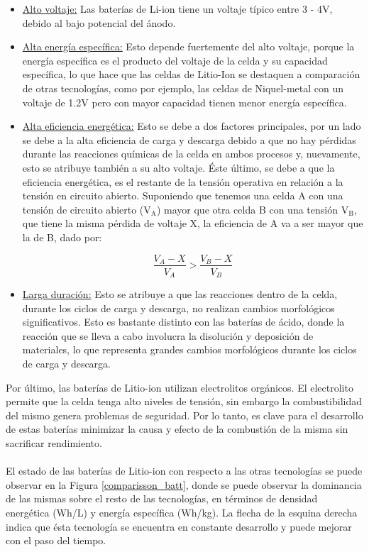 \documentclass[10pt,a4paper]{article}
\begin{document}
	\begin{itemize}
		\item \underline{Alto voltaje:} Las baterías de Li-ion tiene un voltaje 
        típico entre 3 - 4V, debido al bajo potencial del ánodo.
		\item \underline{Alta energía específica:} Esto depende fuertemente del 
        alto voltaje, porque la energía específica es el producto del voltaje 
        de la celda y su capacidad específica, lo que hace que las celdas de 
        Litio-Ion se destaquen a comparación de otras tecnologías, 
        como por ejemplo, las celdas de Niquel-metal con un voltaje de 1.2V 
        pero con mayor capacidad tienen menor energía específica. 
		\item \underline{Alta eficiencia energética:} Esto se debe a dos 
        factores principales, por un lado se debe a la alta eficiencia de 
        carga y descarga debido a que no hay pérdidas durante las reacciones 
        químicas de la celda en ambos procesos y, nuevamente, esto se atribuye 
        también a su alto voltaje. Éste último, se debe a que la eficiencia 
        energética, es el restante de la tensión operativa en relación a la 
        tensión en circuito abierto. Suponiendo que tenemos una celda A con una 
        tensión de circuito abierto ($\mathrm{V_A}$) mayor que otra celda B con 
        una tensión $\mathrm{V_B}$, que tiene la misma pérdida de voltaje X, 
        la eficiencia de A va a ser mayor que la de B, dado por:
		
		\clearpage
		\begin{equation}
			\frac{V_A - X}{V_A} > \frac{V_B - X}{V_B} \nonumber
		\end{equation}
		\item \underline{Larga duración:} Esto se atribuye a que las reacciones 
        dentro de la celda, durante los ciclos de carga y descarga, no realizan 
        cambios morfológicos significativos. Esto es bastante distinto con las 
        baterías de ácido, donde la reacción que se lleva a cabo involucra la 
        disolución y deposición de materiales, lo que representa grandes 
        cambios morfológicos durante los ciclos de carga y descarga.
		
	\end{itemize}
	
	\noindent Por último, las baterías de Litio-ion utilizan electrolitos 
    orgánicos. El electrolito permite que la celda tenga alto niveles de 
    tensión, sin embargo la combustibilidad del mismo genera problemas de 
    seguridad. Por lo tanto, es clave para el desarrollo de estas baterías 
    minimizar la causa y efecto de la combustión de la misma sin sacrificar 
    rendimiento.\\
	\\
	\noindent El estado de las baterías de Litio-ion con respecto a las otras 
    tecnologías se puede observar en la Figura \ref{comparisson_batt}, donde se 
    puede observar la dominancia de las mismas sobre el resto de las 
    tecnologías, en términos de densidad energética (Wh/L) y energía específica 
    (Wh/kg). La flecha de la esquina derecha indica que ésta tecnología se 
    encuentra en constante desarrollo y puede mejorar con el paso del tiempo.
\end{document}
